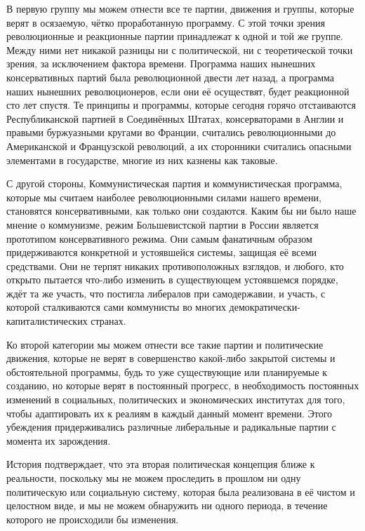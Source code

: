 В первую группу мы можем отнести все те партии, движения и группы, которые верят в осязаемую, чётко проработанную программу. С этой точки зрения революционные и реакционные партии принадлежат к одной и той же группе. Между ними нет никакой разницы ни с политической, ни с теоретической точки зрения, за исключением фактора времени. Программа наших нынешних консервативных партий была революционной двести лет назад, а программа наших нынешних революционеров, если они её осуществят, будет реакционной сто лет спустя. Те принципы и программы, которые сегодня горячо отстаиваются Республиканской партией в Соединённых Штатах, консерваторами в Англии и правыми буржуазными кругами во Франции, считались революционными до Американской и Французской революций, а их сторонники считались опасными элементами в государстве, многие из них казнены как таковые.
 
С другой стороны, Коммунистическая партия и коммунистическая программа, которые мы считаем наиболее революционными силами нашего времени, становятся консервативными, как только они создаются. Каким бы ни было наше мнение о коммунизме, режим Большевистской партии в России является прототипом консервативного режима. Они самым фанатичным образом придерживаются конкретной и устоявшейся системы, защищая её всеми средствами. Они не терпят никаких противоположных взглядов, и любого, кто открыто пытается что-либо изменить в существующем устоявшемся порядке, ждёт та же участь, что постигла либералов при самодержавии, и участь, с которой сталкиваются сами коммунисты во многих демократически-капиталистических странах.

Ко второй категории мы можем отнести все такие партии и политические движения, которые не верят в совершенство какой-либо закрытой системы и обстоятельной программы, будь то уже существующие или планируемые к созданию, но которые верят в постоянный прогресс, в необходимость постоянных изменений в социальных, политических и экономических институтах для того, чтобы адаптировать их к реалиям в каждый данный момент времени. Этого убеждения придерживались различные либеральные и радикальные партии с момента их зарождения.
 
История подтверждает, что эта вторая политическая концепция ближе к реальности, поскольку мы не можем проследить в прошлом ни одну политическую или социальную систему, которая была реализована в её чистом и целостном виде, и мы не можем обнаружить ни одного периода, в течение которого не происходили бы изменения.



